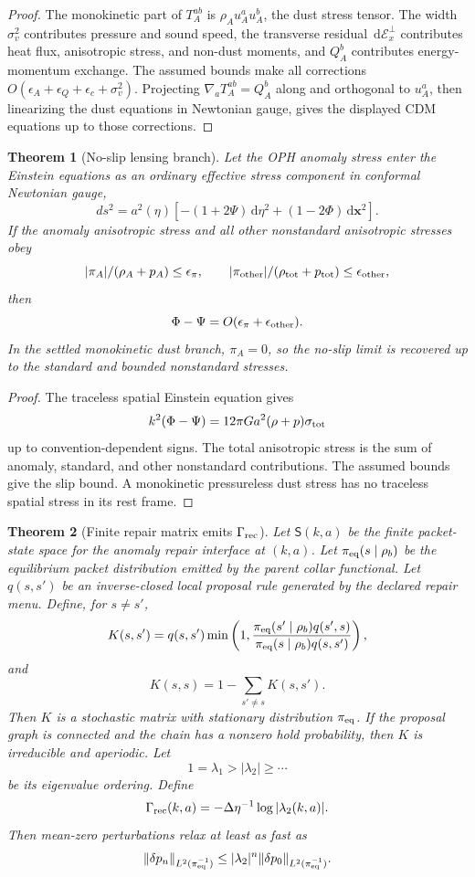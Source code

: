 \documentclass[11pt]{article}
\newtheorem{theorem}{Theorem}[section]
\newcommand{\dd}{\,\mathrm d}
\begin{document}
\begin{proof}
The monokinetic part of \(T_A^{ab}\) is \(\rho_Au_A^au_A^b\), the dust stress tensor. The width
\(\sigma_v^2\) contributes pressure and sound speed, the transverse residual
\(\dd\mathcal E_x^\perp\) contributes heat flux, anisotropic stress, and non-dust moments, and
\(Q_A^b\) contributes energy-momentum exchange. The assumed bounds make all corrections
\(O(\epsilon_A+\epsilon_Q+\epsilon_c+\sigma_v^2)\). Projecting
\(\nabla_aT_A^{ab}=Q_A^b\) along and orthogonal to \(u_A^a\), then linearizing the dust equations in
Newtonian gauge, gives the displayed CDM equations up to those corrections.
\end{proof}

\begin{theorem}[No-slip lensing branch]\label{thm:no-slip-lensing}
Let the OPH anomaly stress enter the Einstein equations as an ordinary effective stress component in
conformal Newtonian gauge,
\[
ds^2=a^2(\eta)\left[-(1+2\Psi)\dd\eta^2+(1-2\Phi)\dd\mathbf x^2\right].
\]
If the anomaly anisotropic stress and all other nonstandard anisotropic stresses obey
\[
|\pi_A|/(\rho_A+p_A)\le\epsilon_\pi,
\qquad
|\pi_{\rm other}|/(\rho_{\rm tot}+p_{\rm tot})\le\epsilon_{\rm other},
\]
then
\[
\Phi-\Psi=O(\epsilon_\pi+\epsilon_{\rm other}).
\]
In the settled monokinetic dust branch, \(\pi_A=0\), so the no-slip limit is recovered up to the
standard and bounded nonstandard stresses.
\end{theorem}

\begin{proof}
The traceless spatial Einstein equation gives
\[
k^2(\Phi-\Psi)=12\pi Ga^2(\rho+p)\sigma_{\rm tot}
\]
up to convention-dependent signs. The total anisotropic stress is the sum of anomaly, standard, and
other nonstandard contributions. The assumed bounds give the slip bound. A monokinetic
pressureless dust stress has no traceless spatial stress in its rest frame.
\end{proof}

\begin{theorem}[Finite repair matrix emits \(\Gamma_{\rm rec}\)]\label{thm:relaxation-transfer}
Let \(\mathsf S(k,a)\) be the finite packet-state space for the anomaly repair interface at
\((k,a)\). Let \(\pi_{\rm eq}(s\mid\rho_b)\) be the equilibrium packet distribution emitted by the
parent collar functional. Let \(q(s,s')\) be an inverse-closed local proposal rule generated by the
declared repair menu. Define, for \(s\ne s'\),
\[
K(s,s')
=
q(s,s')
\min\left(
1,
\frac{
\pi_{\rm eq}(s'\mid\rho_b)q(s',s)
}{
\pi_{\rm eq}(s\mid\rho_b)q(s,s')
}
\right),
\]
and
\[
K(s,s)=1-\sum_{s'\ne s}K(s,s').
\]
Then \(K\) is a stochastic matrix with stationary distribution \(\pi_{\rm eq}\). If the proposal
graph is connected and the chain has a nonzero hold probability, then \(K\) is irreducible and
aperiodic. Let
\[
1=\lambda_1>|\lambda_2|\ge\cdots
\]
be its eigenvalue ordering. Define
\[
\Gamma_{\rm rec}(k,a)
=
-\Delta\eta^{-1}\log|\lambda_2(k,a)|.
\]
Then mean-zero perturbations relax at least as fast as
\[
\|\delta p_n\|_{L^2(\pi_{\rm eq}^{-1})}
\le
|\lambda_2|^n
\|\delta p_0\|_{L^2(\pi_{\rm eq}^{-1})}.
\]
\end{theorem}
\end{document}
